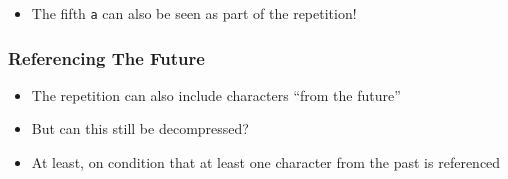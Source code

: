 \begin{frame}
\begin{overprint}
    \begin{itemize}
      \item The fifth \texttt{a} can also be seen as part of the repetition!
    \end{itemize}
  \end{overprint}
  \vskip4mm
  \begin{center}
  \end{center}
\end{frame}

\begin{frame}
  \frametitle{Referencing The Future}
  \begin{itemize}
    \item The repetition can also include characters ``from the future''
    \item But can this still be decompressed? 
    \item<2> At least, on condition that at least one character from the past is referenced
  \end{itemize}
\end{frame}

